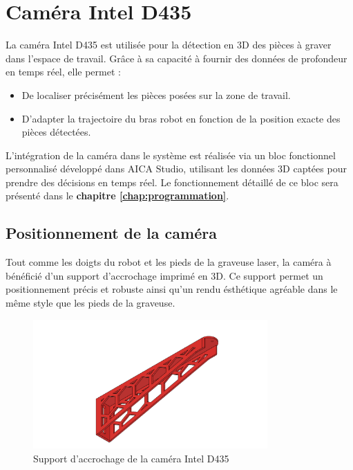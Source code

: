 \section{Caméra Intel D435}

La caméra Intel D435 est utilisée pour la détection en 3D des pièces à graver dans l’espace de travail. Grâce à sa capacité à fournir des données de profondeur en temps réel, elle permet :
\begin{itemize}
    \item De localiser précisément les pièces posées sur la zone de travail.
    \item D’adapter la trajectoire du bras robot en fonction de la position exacte des pièces détectées.
\end{itemize}

L’intégration de la caméra dans le système est réalisée via un bloc fonctionnel personnalisé développé dans AICA Studio, utilisant les données 3D captées pour prendre des décisions en temps réel. Le fonctionnement détaillé de ce bloc sera présenté dans le \textbf{chapitre \ref{chap:programmation}}.

\subsection{Positionnement de la caméra}

Tout comme les doigts du robot et les pieds de la graveuse laser, la caméra à bénéficié d'un support d'accrochage imprimé en 3D. Ce support permet un positionnement précis et robuste ainsi qu'un rendu ésthétique agréable dans le même style que les pieds de la graveuse.

\begin{figure}[H]
    \centering
    \includegraphics[width=0.8\textwidth]{assets/figures/Porte_camera v6.png}
    \caption{Support d'accrochage de la caméra Intel D435}
    \label{fig:support_camera}
\end{figure}

